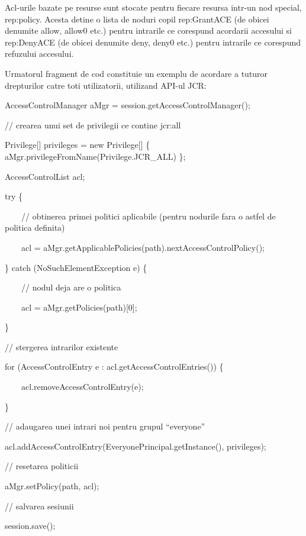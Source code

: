 \documentclass{article}
\begin{document}
Acl-urile bazate pe resurse sunt stocate pentru fiecare resursa intr-un nod special, rep:policy. Acesta detine o lista de noduri copil rep:GrantACE (de obicei denumite allow, allow0 etc.) pentru intrarile ce corespund acordarii accesului si rep:DenyACE (de obicei denumite deny, deny0 etc.) pentru intrarile ce corespund refuzului accesului. 


\bigskip

Urmatorul fragment de cod constituie un exemplu de acordare a tuturor drepturilor catre toti utilizatorii, utilizand API-ul JCR:


\bigskip

AccessControlManager aMgr = session.getAccessControlManager();


\bigskip

// crearea unui set de privilegii ce contine jcr:all

Privilege[] privileges = new Privilege[] \{ aMgr.privilegeFromName(Privilege.JCR\_ALL) \};

AccessControlList acl;

try \{

\ \ \ \ // obtinerea primei politici aplicabile (pentru nodurile fara o astfel de politica definita)

\ \ \ \ acl = aMgr.getApplicablePolicies(path).nextAccessControlPolicy();

\} catch (NoSuchElementException e) \{

\ \ \ \ // nodul deja are o politica

\ \ \ \ acl = aMgr.getPolicies(path)[0];

\}

// stergerea intrarilor existente

for (AccessControlEntry e : acl.getAccessControlEntries()) \{

\ \ \ \ acl.removeAccessControlEntry(e);

\}

// adaugarea unei intrari noi pentru grupul ``everyone''

acl.addAccessControlEntry(EveryonePrincipal.getInstance(), privileges);


\bigskip

// resetarea politicii

aMgr.setPolicy(path, acl);


\bigskip

// salvarea sesiunii

session.save();


\bigskip
\end{document}

